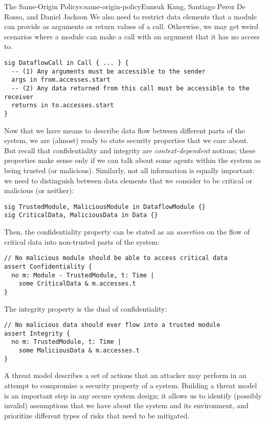 \begin{aosachapter}{The Same-Origin Policy}{s:same-origin-policy}{Eunsuk Kang, Santiago Perez De Rosso, and Daniel Jackson}
We also need to restrict data elements that a module can provide as
arguments or return values of a call. Otherwise, we may get weird
scenarios where a module can make a call with an argument that it has no
access to.

\begin{verbatim}
sig DataflowCall in Call { ... } {
  -- (1) Any arguments must be accessible to the sender
  args in from.accesses.start
  -- (2) Any data returned from this call must be accessible to the receiver
  returns in to.accesses.start
}
\end{verbatim}

Now that we have means to describe data flow between different parts of
the system, we are (almost) ready to state security properties that we
care about. But recall that confidentiality and integrity are
\emph{context-dependent} notions; these properties make sense only if we
can talk about some agents within the system as being trusted (or
malicious). Similarly, not all information is equally important: we need
to distinguish between data elements that we consider to be critical or
malicious (or neither):

\begin{verbatim}
sig TrustedModule, MaliciousModule in DataflowModule {}
sig CriticalData, MaliciousData in Data {}
\end{verbatim}

Then, the confidentiality property can be stated as an \emph{assertion}
on the flow of critical data into non-trusted parts of the system:

\begin{verbatim}
// No malicious module should be able to access critical data
assert Confidentiality {
  no m: Module - TrustedModule, t: Time |
    some CriticalData & m.accesses.t 
}
\end{verbatim}

The integrity property is the dual of confidentiality:

\begin{verbatim}
// No malicious data should ever flow into a trusted module
assert Integrity {
  no m: TrustedModule, t: Time | 
    some MaliciousData & m.accesses.t
}
\end{verbatim}

\label{threat-model}

A threat model describes a set of actions that an attacker may perform
in an attempt to compromise a security property of a system. Building a
threat model is an important step in any secure system design; it allows
us to identify (possibly invalid) assumptions that we have about the
system and its environment, and prioritize different types of risks that
need to be mitigated.


\end{aosachapter}
